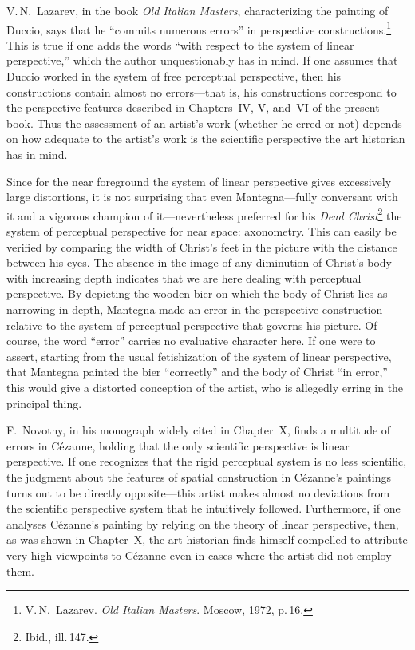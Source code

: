 V.\,N.~Lazarev, in the book \emph{Old Italian Masters}, characterizing the painting of
Duccio, says that he ``commits numerous errors'' in perspective constructions.\footnote{V.\,N.~Lazarev.
  \emph{Old Italian Masters}.  Moscow, 1972, p.\,16.}  This is true if one adds
the words ``with respect to the system of linear perspective,'' which the author
unquestionably has in mind.  If one assumes that Duccio worked in the system of free
perceptual perspective, then his constructions contain almost no errors---that is, his
constructions correspond to the perspective features described in Chapters~IV, V,
and~VI of the present book.  Thus the assessment of an artist's work (whether he erred
or not) depends on how adequate to the artist's work is the scientific perspective the
art historian has in mind.


Since for the near foreground the system of linear perspective gives excessively large
distortions, it is not surprising that even Mantegna---fully conversant with it and a
vigorous champion of it---nevertheless preferred for his
\emph{Dead Christ}\footnote{Ibid., ill.\,147.}
the system of perceptual perspective for near space: axonometry.  This can easily be
verified by comparing the width of Christ's feet in the picture with the distance between
his eyes.  The absence in the image of any diminution of Christ's body with increasing
depth indicates that we are here dealing with perceptual perspective.  By depicting the
wooden bier on which the body of Christ lies as narrowing in depth, Mantegna made an
error in the perspective construction relative to the system of perceptual perspective
that governs his picture.  Of course, the word ``error'' carries no evaluative
character here.  If one were to assert, starting from the usual fetishization of the
system of linear perspective, that Mantegna painted the bier ``correctly'' and the body
of Christ ``in error,'' this would give a distorted conception of the artist, who is
allegedly erring in the principal thing.

F.~Novotny, in his monograph widely cited in Chapter~X, finds a multitude of errors in
Cézanne, holding that the only scientific perspective is linear perspective.  If one
recognizes that the rigid perceptual system is no less scientific, the judgment about the
features of spatial construction in Cézanne's paintings turns out to be directly
opposite---this artist makes almost no deviations from the scientific perspective system
that he intuitively followed.  Furthermore, if one analyses Cézanne's painting by
relying on the theory of linear perspective, then, as was shown in Chapter~X, the art
historian finds himself compelled to attribute very high viewpoints to Cézanne even in
cases where the artist did not employ them.


